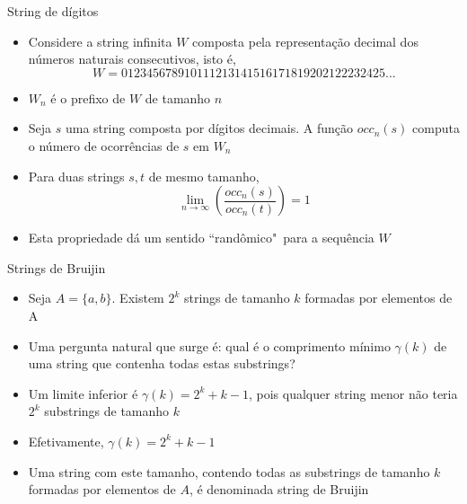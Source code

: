 \begin{frame}[fragile]{String de dígitos}

    \begin{itemize}
        \item Considere a string infinita $W$ composta pela representação decimal dos números 
            naturais consecutivos, isto é,
        \[
            W = 012345678910111213141516171819202122232425...
        \]

        \item $W_n$ é o prefixo de $W$ de tamanho $n$

        \item Seja $s$ uma string composta por dígitos decimais. A função $occ_n(s)$ computa o 
            número de ocorrências de $s$ em $W_n$

        \item Para duas strings $s, t$ de mesmo tamanho, 
        \[
            \lim_{n\to\infty} \left(\frac{occ_n(s)}{occ_n(t)}\right) = 1
        \]

        \item Esta propriedade dá um sentido ``randômico"\ para a sequência $W$
    \end{itemize}

\end{frame}

\begin{frame}[fragile]{Strings de Bruijin}

    \begin{itemize}
        \item Seja $A = \lbrace a, b\rbrace$. Existem $2^k$ strings de tamanho $k$ formadas por 
            elementos de A

        \item Uma pergunta natural que surge é: qual é o comprimento mínimo $\gamma(k)$ de uma 
            string que contenha todas estas substrings?

        \item Um limite inferior é $\gamma(k) = 2^k + k - 1$, pois qualquer string menor não teria 
            $2^k$ substrings de tamanho $k$

        \item Efetivamente, $\gamma(k) = 2^k + k - 1$

        \item Uma string com este tamanho, contendo todas as substrings de tamanho $k$ formadas 
            por elementos de $A$, é denominada string de Bruijin

    \end{itemize}

\end{frame}

